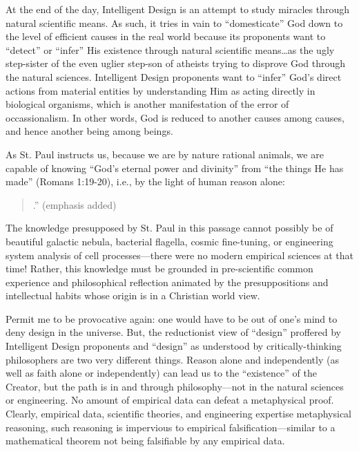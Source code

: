 At the end of the day, Intelligent Design is an attempt to study miracles through natural scientific means. As such, it tries in vain to ``domesticate'' God down to the level of efficient causes in the real world because its proponents want to ``detect'' or ``infer'' His existence  through natural scientific means\ldots as the ugly step-sister of the even uglier step-son of atheists trying to disprove God through the natural sciences. Intelligent Design proponents want to ``infer'' God's direct actions from material entities by understanding Him as acting directly in biological organisms, which is another manifestation of the error of occassionalism.  In other words, God is reduced to another causes among causes, and hence another being among beings.

As St. Paul instructs us, because we are by nature rational animals, we are capable of knowing ``God's eternal power and divinity'' from ``the things He has made'' (Romans 1:19-20), i.e., by the light of human reason alone:

\begin{quote}
.'' (emphasis added)
\end{quote}

The knowledge presupposed by St. Paul in this passage cannot possibly be of beautiful galactic nebula, bacterial flagella, cosmic fine-tuning, or engineering system analysis of cell processes---there were no modern empirical sciences at that time! Rather, this knowledge must be grounded in pre-scientific common experience and philosophical reflection animated by the presuppositions and intellectual habits whose origin is in a Christian world view.

Permit me to be provocative again: one would have to be out of one's mind to deny design in the universe. But, the reductionist view of ``design'' proffered by Intelligent Design proponents and ``design'' as understood by critically-thinking philosophers are two very different things. Reason alone and independently (as well as faith alone or independently) can lead us to the ``existence'' of the Creator, but the path is in and through philosophy---not in the natural sciences or engineering. No amount of empirical data can defeat a metaphysical proof. Clearly, empirical data, scientific theories, and engineering expertise  metaphysical reasoning, such reasoning is impervious to empirical falsification---similar to a mathematical theorem not being falsifiable by any empirical data.

